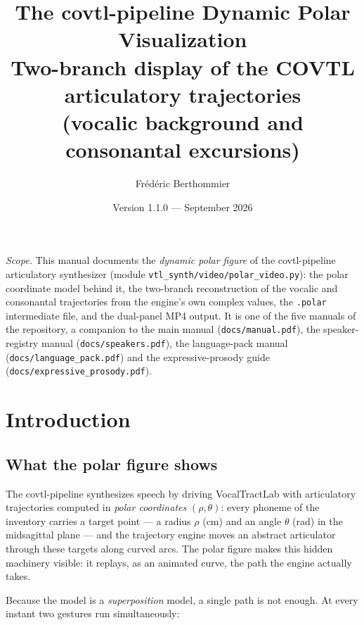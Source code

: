\documentclass[11pt,a4paper]{article}
\title{\textbf{The covtl-pipeline Dynamic Polar Visualization}\\[0.4em]
\large Two-branch display of the COVTL articulatory trajectories\\
(vocalic background and consonantal excursions)}
\author{Fr\'ed\'eric Berthommier}
\date{Version 1.1.0 --- September 2026}
\newcommand{\code}[1]{\texttt{#1}}
\begin{document}
\maketitle

\begin{center}
\begin{minipage}{0.88\textwidth}
\small\emph{Scope.} This manual documents the \emph{dynamic polar
figure} of the covtl-pipeline articulatory synthesizer (module
\code{vtl\_synth/video/polar\_video.py}): the polar coordinate model
behind it, the two-branch reconstruction of the vocalic and
consonantal trajectories from the engine's own complex values, the
\code{.polar} intermediate file, and the dual-panel MP4 output. It is
one of the five manuals of the repository, a companion to the main
manual (\code{docs/manual.pdf}), the speaker-registry manual
(\code{docs/speakers.pdf}), the language-pack manual
(\code{docs/language\_pack.pdf}) and the expressive-prosody guide
(\code{docs/expressive\_prosody.pdf}).
\end{minipage}
\end{center}

\vspace{0.5em}
\tableofcontents
\vspace{1em}

\section{Introduction}

\subsection{What the polar figure shows}

The covtl-pipeline synthesizes speech by driving VocalTractLab with
articulatory trajectories computed in \emph{polar coordinates}
$(\rho, \theta)$: every phoneme of the inventory carries a target
point --- a radius $\rho$ (cm) and an angle $\theta$ (rad) in the
midsagittal plane --- and the trajectory engine moves an abstract
articulator through these targets along curved arcs. The polar
figure makes this hidden machinery visible: it replays, as an
animated curve, the path the engine actually takes.

Because the model is a \emph{superposition} model, a single path is
not enough. At every instant two gestures run simultaneously:
\end{document}
